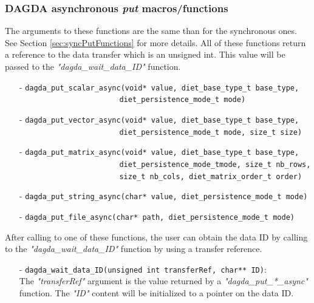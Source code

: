 \subsubsection{DAGDA asynchronous \textit{put} macros/functions}
The arguments to these functions are the same than for the synchronous ones.
See Section \ref{sec:syncPutFunctions} for more details. All of these functions
return a reference to the data transfer which is an unsigned int. This value
will be passed to the \textit{"dagda\_wait\_data\_ID"} function.
\begin{itemize}
\item[-] \verb#dagda_put_scalar_async(void* value, diet_base_type_t base_type,#\\
         \verb#                       diet_persistence_mode_t mode)#
\item[-] \verb#dagda_put_vector_async(void* value, diet_base_type_t base_type,#\\
         \verb#                       diet_persistence_mode_t mode, size_t size)#
\item[-] \verb#dagda_put_matrix_async(void* value, diet_base_type_t base_type,#\\
         \verb#                       diet_persistence_mode_tmode, size_t nb_rows,#\\
         \verb#                       size_t nb_cols, diet_matrix_order_t order)#
\item[-] \verb#dagda_put_string_async(char* value, diet_persistence_mode_t mode)#
\item[-] \verb#dagda_put_file_async(char* path, diet_persistence_mode_t mode)#
\end{itemize}
After calling to one of these functions, the user can obtain the data ID by
calling to the \textit{"dagda\_wait\_data\_ID"} function by using a transfer
reference.
\begin{itemize}
  \item[-] \verb#dagda_wait_data_ID(unsigned int transferRef, char** ID)#:\\
    The \textit{"transferRef"} argument is the value returned by a
    \textit{"dagda\_put\_*\_async"} function. The \textit{"ID"} content will
    be initialized to a pointer on the data ID.
\end{itemize}

